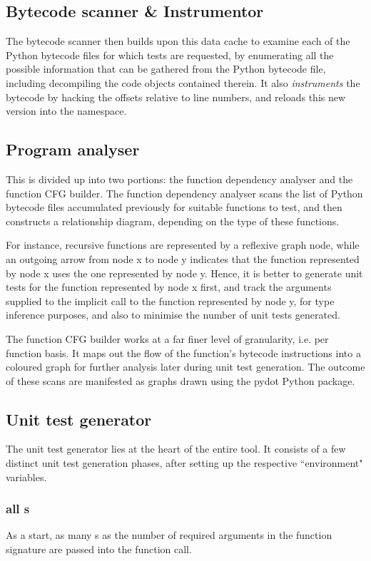 \documentclass{icldt}
\numberwithin{equation}{section}       %
\begin{document}
{{\subsection{Bytecode scanner \& Instrumentor}
The bytecode scanner then builds upon this data cache to examine each of the Python bytecode files for which tests are requested, by enumerating all the possible information that can be gathered from the Python bytecode file, including decompiling the code objects contained therein. It also \emph{instruments} the bytecode by hacking the offsets relative to line numbers, and reloads this new version into the  namespace.

\subsection{Program analyser}
This is divided up into two portions: the function dependency analyser and the function CFG builder. The function dependency analyser scans the list of Python bytecode files accumulated previously for suitable functions to test, and then constructs a relationship diagram, depending on the type of these functions.

For instance, recursive functions are represented by a reflexive graph node, while an outgoing arrow from node x to node y indicates that the function represented by node x uses the one represented by node y. Hence, it is better to generate unit tests for the function represented by node x first, and track the arguments supplied to the implicit call to the function represented by node y, for type inference purposes, and also to minimise the number of unit tests generated.

The function CFG builder works at a far finer level of granularity, i.e. per function basis. It maps out the flow of the function's bytecode instructions into a coloured graph for further analysis later during unit test generation. The outcome of these scans are manifested as graphs drawn using the \textsf{pydot} Python package.

\subsection{Unit test generator}
The unit test generator lies at the heart of the entire tool. It consists of a few distinct unit test generation phases, after setting up the respective ``environment" variables.

\subsubsection{all s}
As a start, as many s as the number of required arguments in the function signature are passed into the function call.

}}
\end{document}
